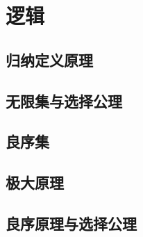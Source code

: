 \documentclass{ctexrep}
\begin{document}
  \section{逻辑}
  \subsection{归纳定义原理}
  \subsection{无限集与选择公理}
  \subsection{良序集}
  \subsection{极大原理}
  \subsection{良序原理与选择公理}

 
\ifx\allfiles\undefined %
\end{document}
